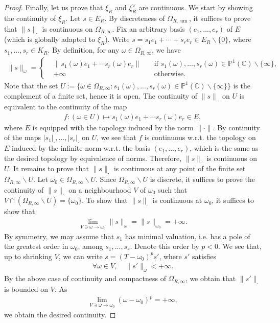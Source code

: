 \documentclass [11pt,reqno]{amsart}
\def\bC{{\mathbb{C}}}
\newcommand{\1}{\mathmybb{1}}
\def\um{\operatorname{um}}
\def\setminus{\smallsetminus}
\begin{document}
\begin{proof}
Finally, let us prove that $\xi_R$ and $\xi_R^{\vee}$ are continuous. We start by showing the continuity of $\xi_R$. Let $s\in E_R$. By discreteness of $\Omega_{R,\um}$, it suffices to prove that $\|s\|_{\cdot}$ is continuous on $\Omega_{R,\infty}$. Fix an arbitrary basis $(e_1,...,e_r)$ of $E$ (which is globally adapted to $\xi_R$). Write $s=s_1e_1 + \cdots + s_re_r \in E_R\setminus\{0\}$, where $s_1,...,s_r\in K_{R}$. By definition, for any $\omega\in\Omega_{R,\infty}$, we have 
\begin{align*}
\|s\|_{\omega} = \left\{\begin{matrix}
&\|s_1(\omega)e_1+\cdots s_{r}(\omega)e_r\| \quad &\text{if } s_1(\omega),...,s_{r}(\omega)\in \mathbb{P}^{1}(\bC)\setminus\{\infty\},\\
&+\infty \quad &\text{otherwise}.
\end{matrix}\right.
\end{align*}
Note that the set $U := \{\omega\in \Omega_{R,\infty} : s_1(\omega),...,s_{r}(\omega)\in \mathbb{P}^{1}(\bC)\setminus\{\infty\}\}$ is the complement of a finite set, hence it is open. The continuity of $\|s\|_{\cdot}$ on $U$ is equivalent to the continuity of the map
\begin{align*}
f : (\omega\in U) \mapsto s_1(\omega)e_1 + \cdots s_{r}(\omega) e_r \in E,
\end{align*}
where $E$ is equipped with the topology induced by the norm $\|\cdot\|$. By continuity of the maps $|s_1|_{\cdot},...,|s_r|_{\cdot}$ on $U$, we see that $f$ is continuous w.r.t. the topology on $E$ induced by the infinite norm w.r.t. the basis $(e_1,...,e_r)$, which is the same as the desired topology by equivalence of norms. Therefore, $\|s\|_{\cdot}$ is continuous on $U$. It remains to prove that $\|s\|_{\cdot}$ is continuous at any point of the finite set $\Omega_{R,\infty}\setminus U$. Let $\omega_0 \in \Omega_{R,\infty}\setminus U$. Since $\Omega_{R,\infty}\setminus U$ is discrete, it suffices to prove the continuity of $\|s\|_{\cdot}$ on a neighbourhood $V$ of $\omega_0$ such that $V\cap (\Omega_{R,\infty}\setminus U) = \{\omega_0\}$. To show that $\|s\|_{\cdot}$ is continuous at $\omega_0$, it suffices to show that 
\begin{align*}
\displaystyle\lim_{V \ni\omega\to \omega_0}\|s\|_{\omega} = \|s\|_{\omega_0} = +\infty. 
\end{align*}
By symmetry, we may assume that $s_1$ has minimal valuation, i.e. has a pole of the greatest order in $\omega_0$, among $s_1,...,s_r$. Denote this order by $p<0$. We see that, up to shrinking $V$, we can write $s=(T-\omega_0)^{p}s'$, where $s'$ satisfies 
\begin{align*}
\forall \omega\in V, \quad \|s'\|_{\omega}<+\infty. 
\end{align*}
By the above case of continuity and compactness of $\Omega_{R,\infty}$, we obtain that $\|s'\|_{\cdot}$ is bounded on $V$. As 
\begin{align*}
\displaystyle\lim_{V \ni\omega\to \omega_0}(\omega-\omega_{0})^{p} = +\infty,
\end{align*}
we obtain the desired continuity. 


\end{proof}
\end{document}
